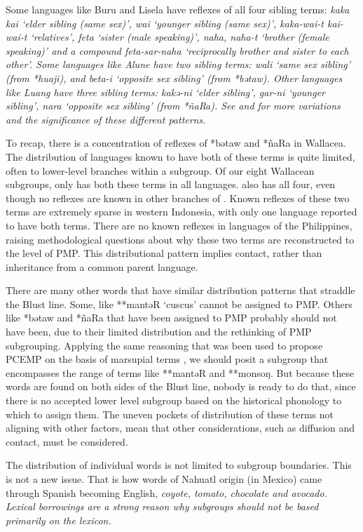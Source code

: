 Some languages like Buru
and Lisela have reflexes of all four sibling terms: \it{kaka
{\tl} kai} ‘elder sibling (same sex)’,
\it{wai} ‘younger sibling (same sex)’,
\it{kaka-wai-t {\tl} kai-wai-t} ‘relatives’,
\it{feta} ‘sister (male speaking)’,
\it{naha, naha-t} ‘brother (female speaking)’
and a compound \it{feta-sar-naha} ‘reciprocally brother
and sister to each other’.
Some languages like Alune have two sibling terms: \it{wali} ‘same
sex sibling’ (from *huaji),
and \it{beta-i} ‘opposite sex sibling’ (from *bətaw).
Other languages like Luang have three sibling terms: \it{kakə-ni}
‘elder sibling’, \it{gar-ni} ‘younger sibling’, \it{nara} ‘opposite sex sibling’ (from *ñaRa).
See \citet{Fox2015} and  for more variations
and the significance of these different patterns.

To recap, there is a concentration of reflexes of *bətaw
and *ñaRa in Wallacea.
The distribution of languages known to have both of these terms
is quite limited, often to lower-level branches within a subgroup.
Of our eight Wallacean subgroups,
only  has both these terms in all languages.
 also has all four,
even though no reflexes are known in other branches of .
Known reflexes of these two terms are extremely sparse in western
Indonesia, with only one language reported to have both terms.
There are no known reflexes in languages of the Philippines,
raising methodological questions about why these two terms are
reconstructed to the level of PMP.
This distributional pattern implies contact,
rather than inheritance from a common parent language.

There are many other words that have similar distribution patterns
that straddle the Blust line.
Some, like **mantəR ‘cuscus’ cannot be assigned to PMP.
Others like *bətaw and *ñaRa that have been assigned to PMP probably
should not have been,
due to their limited distribution
and the rethinking of PMP subgrouping.
Applying the same reasoning that was been used to propose PCEMP
on the basis of marsupial terms \citep{Blust1982,Blust2012b},
we should posit a subgroup that encompasses the range
of terms like **mantəR and **monsoŋ.
But because these words are found on both sides of the Blust
line, nobody is ready to do that,
since there is no accepted lower level subgroup based on the
historical phonology to which to assign them.
The uneven pockets of distribution of these terms not aligning
with other factors, mean that other considerations,
such as diffusion and contact, must be considered.

The distribution of individual words is not limited to subgroup boundaries.
This is not a new issue.
That is how words of Nahuatl origin (in Mexico) came through
Spanish becoming English, \it{coyote, tomato, chocolate} and \it{avocado}.
Lexical borrowings are a strong reason why subgroups should not
be based primarily on the lexicon.